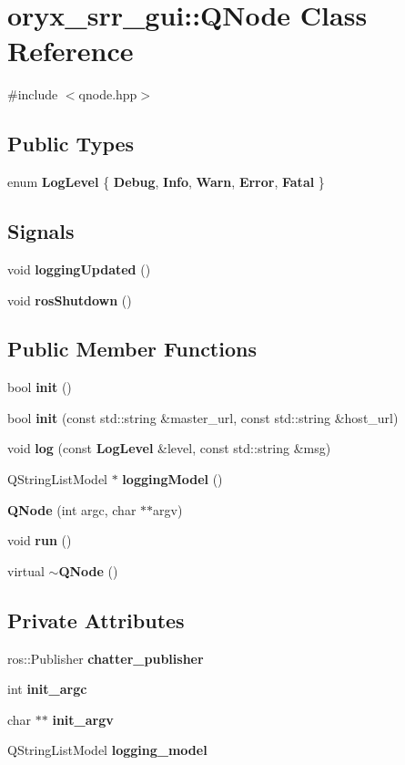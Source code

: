 \section{oryx\-\_\-srr\-\_\-gui\-:\-:\-Q\-Node \-Class \-Reference}
\label{classoryx__srr__gui_1_1QNode}


{\ttfamily \#include $<$qnode.\-hpp$>$}

\subsection*{\-Public \-Types}
\begin{DoxyCompactItemize}
\item 
enum {\bf \-Log\-Level} \{ \*
{\bf \-Debug}, 
{\bf \-Info}, 
{\bf \-Warn}, 
{\bf \-Error}, 
\*
{\bf \-Fatal}
 \}
\end{DoxyCompactItemize}
\subsection*{\-Signals}
\begin{DoxyCompactItemize}
\item 
void {\bf logging\-Updated} ()
\item 
void {\bf ros\-Shutdown} ()
\end{DoxyCompactItemize}
\subsection*{\-Public \-Member \-Functions}
\begin{DoxyCompactItemize}
\item 
bool {\bf init} ()
\item 
bool {\bf init} (const std\-::string \&master\-\_\-url, const std\-::string \&host\-\_\-url)
\item 
void {\bf log} (const {\bf \-Log\-Level} \&level, const std\-::string \&msg)
\item 
\-Q\-String\-List\-Model $\ast$ {\bf logging\-Model} ()
\item 
{\bf \-Q\-Node} (int argc, char $\ast$$\ast$argv)
\item 
void {\bf run} ()
\item 
virtual {\bf $\sim$\-Q\-Node} ()
\end{DoxyCompactItemize}
\subsection*{\-Private \-Attributes}
\begin{DoxyCompactItemize}
\item 
ros\-::\-Publisher {\bf chatter\-\_\-publisher}
\item 
int {\bf init\-\_\-argc}
\item 
char $\ast$$\ast$ {\bf init\-\_\-argv}
\item 
\-Q\-String\-List\-Model {\bf logging\-\_\-model}
\end{DoxyCompactItemize}


